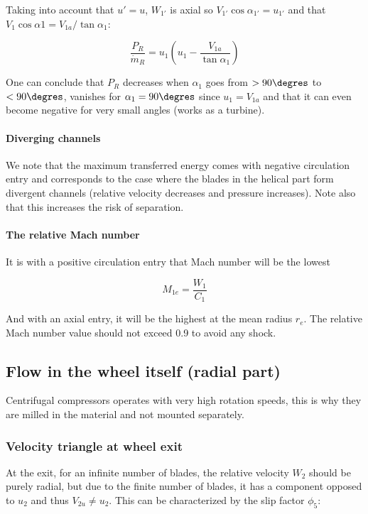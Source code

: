 Taking into account that $u' = u$, $W_{1'}$ is axial so $V_{1'}\cos \alpha _{1'} = u_{1'}$ and that $V_1\cos \alpha 1 = V_{1a}/\tan \alpha _1$:

\begin{equation}
\frac{P_R}{\dot{m}_R} = u_1 \left( u_1 - \frac{V_{1a}}{\tan \alpha _1} \right)
\end{equation}

One can conclude that $P_R$ decreases when $\alpha _1$ goes from $>90\degres$ to $<90\degres$, vanishes for $\alpha _1 = 90\degres$ since $u_1 = V_{1a}$ and that it can even become negative for very small angles (works as a turbine).

\paragraph{Diverging channels}
We note that the maximum transferred energy comes with negative circulation entry and corresponds to the case where the blades in the helical part form divergent channels (relative velocity decreases and pressure increases). Note also that this increases the risk of separation. 

\paragraph{The relative Mach number}
It is with a positive circulation entry that Mach number will be the lowest 

\begin{equation}
M_{1e} = \frac{W_1}{C_1}
\end{equation} 

And with an axial entry, it will be the highest at the mean radius $r_e$. The relative Mach number value should not exceed 0.9 to avoid any shock. 

\subsection{Flow in the wheel itself (radial part)}
Centrifugal compressors operates with very high rotation speeds, this is why they are milled in the material and not mounted separately. 

\subsubsection{Velocity triangle at wheel exit}
At the exit, for an infinite number of blades, the relative velocity $W_2$ should be purely radial, but due to the finite number of blades, it has a component opposed to $u_2$ and thus $V_{2u} \neq u_2$. This can be characterized by the slip factor $\phi _5$: 

